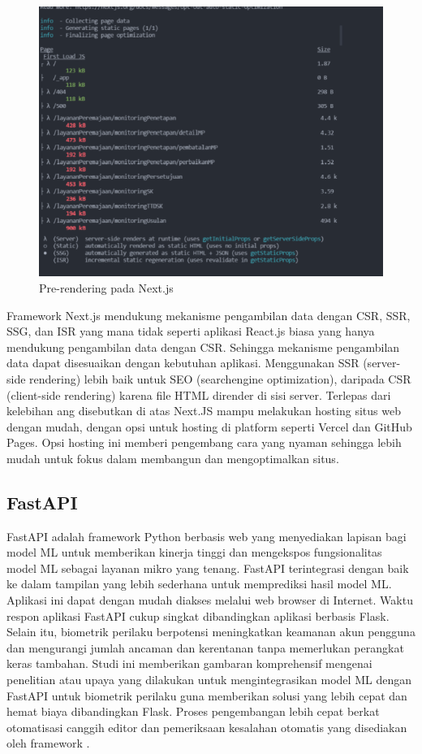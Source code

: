\begin{figure} [H] \centering
  \includegraphics[scale=1]{gambar/bab2/prerender.png}
  \caption{Pre-rendering pada Next.js \parencite{lazuardy2022}}
  \label{fig:prerenderingnextjs}
\end{figure}

Framework Next.js mendukung mekanisme pengambilan data dengan CSR, SSR, SSG, dan ISR yang mana tidak seperti aplikasi React.js biasa yang hanya mendukung pengambilan data dengan CSR. Sehingga mekanisme pengambilan data dapat disesuaikan dengan kebutuhan aplikasi. Menggunakan SSR (server-side rendering) lebih baik untuk SEO (searchengine optimization), daripada CSR (client-side rendering) karena file HTML dirender di sisi server\parencite{lazuardy2022}. Terlepas dari kelebihan ang disebutkan di atas Next.JS mampu melakukan hosting situs web dengan mudah, dengan opsi untuk hosting di platform seperti Vercel dan GitHub Pages. Opsi hosting ini memberi pengembang cara yang nyaman sehingga lebih mudah untuk fokus dalam membangun dan mengoptimalkan situs\parencite{Patel2023}.

\subsection{FastAPI}
FastAPI adalah framework Python berbasis web yang menyediakan lapisan bagi model ML untuk memberikan kinerja tinggi dan mengekspos fungsionalitas model ML sebagai layanan mikro yang tenang. FastAPI terintegrasi dengan baik ke dalam tampilan yang lebih sederhana untuk memprediksi hasil model ML. Aplikasi ini dapat dengan mudah diakses melalui  web browser di Internet. Waktu respon aplikasi FastAPI cukup singkat dibandingkan aplikasi berbasis Flask. Selain itu, biometrik perilaku berpotensi meningkatkan keamanan akun pengguna dan mengurangi jumlah ancaman dan kerentanan tanpa memerlukan perangkat keras tambahan. Studi ini memberikan gambaran komprehensif mengenai penelitian atau upaya yang dilakukan untuk mengintegrasikan model ML dengan FastAPI untuk biometrik perilaku guna memberikan solusi yang lebih cepat dan hemat biaya dibandingkan Flask. Proses pengembangan lebih cepat berkat otomatisasi canggih editor dan pemeriksaan kesalahan otomatis yang disediakan oleh framework \parencite{Bansal2022}.

